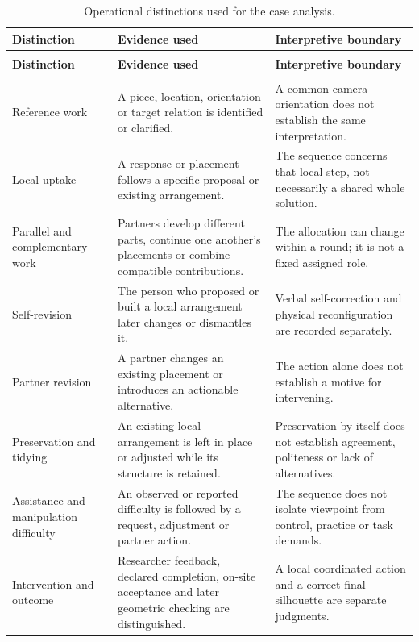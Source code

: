 \begingroup
{}
\fontsize{9.5}{11.685}\selectfont
\setlength{\tabcolsep}{2.2pt}
\renewcommand{\arraystretch}{1.08}
\begin{longtable}{@{}>{\raggedright\arraybackslash}p{28.439mm}>{\raggedright\arraybackslash}p{62.763mm}>{\raggedright\arraybackslash}p{65.705mm}@{}}
\caption[Operational distinctions used for the case analysis.]{Operational distinctions used for the case analysis.}\label{tab:C-1}\\
\toprule
\textbf{Distinction} & \textbf{Evidence used} & \textbf{Interpretive boundary} \\
\midrule
\endfirsthead
\multicolumn{3}{l}{\small\itshape Table \thetable{} (continued)}\\
\toprule
\textbf{Distinction} & \textbf{Evidence used} & \textbf{Interpretive boundary} \\
\midrule
\endhead
\midrule
\multicolumn{3}{r}{\small Continued on next page}\\
\endfoot
\bottomrule
\endlastfoot
Reference work & A piece, location, orientation or target relation is identified or clarified. & A common camera orientation does not establish the same interpretation. \\
\addlinespace[3pt]
Local uptake & A response or placement follows a specific proposal or existing arrangement. & The sequence concerns that local step, not necessarily a shared whole solution. \\
\addlinespace[3pt]
Parallel and complementary work & Partners develop different parts, continue one another's placements or combine compatible contributions. & The allocation can change within a round; it is not a fixed assigned role. \\
\addlinespace[3pt]
Self-revision & The person who proposed or built a local arrangement later changes or dismantles it. & Verbal self-correction and physical reconfiguration are recorded separately. \\
\addlinespace[3pt]
Partner revision & A partner changes an existing placement or introduces an actionable alternative. & The action alone does not establish a motive for intervening. \\
\addlinespace[3pt]
Preservation and tidying & An existing local arrangement is left in place or adjusted while its structure is retained. & Preservation by itself does not establish agreement, politeness or lack of alternatives. \\
\addlinespace[3pt]
Assistance and manipulation difficulty & An observed or reported difficulty is followed by a request, adjustment or partner action. & The sequence does not isolate viewpoint from control, practice or task demands. \\
\addlinespace[3pt]
Intervention and outcome & Researcher feedback, declared completion, on-site acceptance and later geometric checking are distinguished. & A local coordinated action and a correct final silhouette are separate judgments. \\
\end{longtable}
\endgroup

